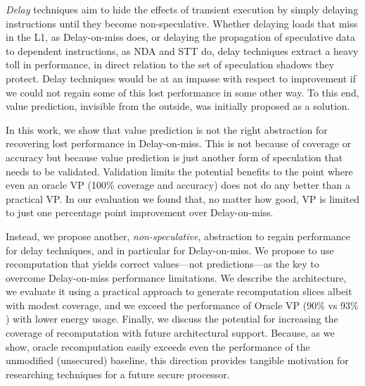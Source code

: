 \emph{Delay} techniques aim to hide the effects of transient execution by simply delaying instructions until they become non-speculative. Whether delaying loads that miss in the L1, as Delay-on-miss does, or delaying the propagation of speculative data to dependent instructions, as NDA and STT do, delay techniques extract a heavy toll in performance, in direct relation to the set of speculation shadows they protect. Delay techniques would be at an impasse with respect to improvement if we could not regain some of this lost performance in some other way. To this end, value prediction, invisible from the outside, was initially proposed as a solution.

In this work, we show that value prediction is not the right abstraction for recovering lost performance in Delay-on-miss. This is not because of coverage or accuracy but because value prediction is just another form of speculation that needs to be validated. Validation limits the potential benefits to the point where even an oracle VP (100\% coverage and accuracy) does not do any better than a practical VP. In our evaluation we found that, no matter how good, VP is limited to just one percentage point improvement over Delay-on-miss.

Instead, we propose another, \emph{non-speculative}, abstraction to regain performance for delay techniques, and in particular for Delay-on-miss. We propose to use recomputation that yields correct values---not predictions---as the key to overcome Delay-on-miss performance limitations. We describe the architecture, we evaluate it using a practical approach to generate recomputation slices albeit with modest coverage, and we exceed the performance of Oracle VP ($90\%$ vs $93\%$) with lower energy usage. Finally, we discuss the potential for increasing the coverage of recomputation with future architectural support. Because, as we show, oracle recomputation easily exceeds even the performance of the unmodified (unsecured) baseline, this direction provides tangible motivation for researching techniques for a future secure processor. %



